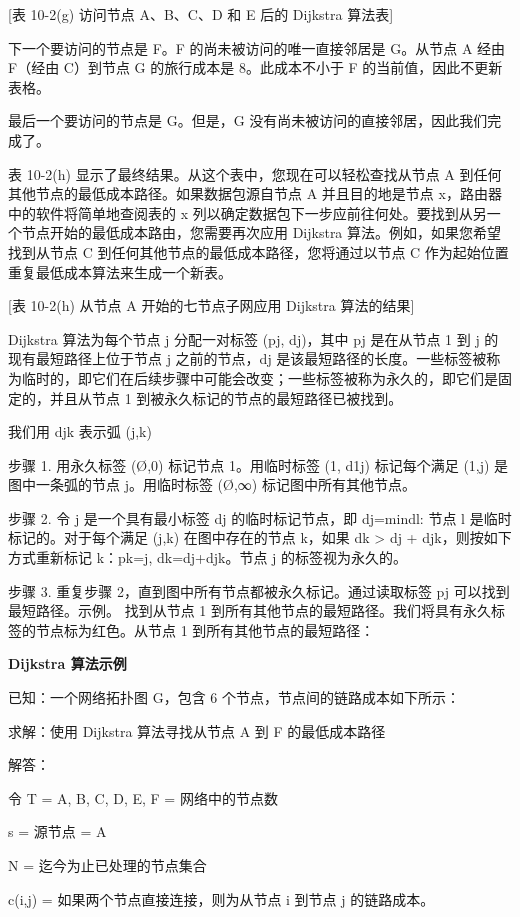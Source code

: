 \documentclass[12pt,a4paper,oneside,UTF8]{ctexart}
\begin{document}
[表 10-2(g) 访问节点 A、B、C、D 和 E 后的 Dijkstra 算法表]

下一个要访问的节点是 F。F 的尚未被访问的唯一直接邻居是 G。从节点 A 经由 F（经由 C）到节点 G 的旅行成本是 8。此成本不小于 F 的当前值，因此不更新表格。

最后一个要访问的节点是 G。但是，G 没有尚未被访问的直接邻居，因此我们完成了。

表 10-2(h) 显示了最终结果。从这个表中，您现在可以轻松查找从节点 A 到任何其他节点的最低成本路径。如果数据包源自节点 A 并且目的地是节点 x，路由器中的软件将简单地查阅表的 x 列以确定数据包下一步应前往何处。要找到从另一个节点开始的最低成本路由，您需要再次应用 Dijkstra 算法。例如，如果您希望找到从节点 C 到任何其他节点的最低成本路径，您将通过以节点 C 作为起始位置重复最低成本算法来生成一个新表。

[表 10-2(h) 从节点 A 开始的七节点子网应用 Dijkstra 算法的结果]

Dijkstra 算法为每个节点 j 分配一对标签 (pj, dj)，其中 pj 是在从节点 1 到 j 的现有最短路径上位于节点 j 之前的节点，dj 是该最短路径的长度。一些标签被称为临时的，即它们在后续步骤中可能会改变；一些标签被称为永久的，即它们是固定的，并且从节点 1 到被永久标记的节点的最短路径已被找到。

我们用 djk 表示弧 (j,k) 

步骤 1. 用永久标签 (Ø,0) 标记节点 1。用临时标签 (1, d1j) 标记每个满足 (1,j) 是图中一条弧的节点 j。用临时标签 (Ø,∞) 标记图中所有其他节点。

步骤 2. 令 j 是一个具有最小标签 dj 的临时标记节点，即 dj=min{dl: 节点 l 是临时标记的}。对于每个满足 (j,k) 在图中存在的节点 k，如果 dk > dj + djk，则按如下方式重新标记 k：pk=j, dk=dj+djk。节点 j 的标签视为永久的。

步骤 3. 重复步骤 2，直到图中所有节点都被永久标记。通过读取标签 pj 可以找到最短路径。示例。 找到从节点 1 到所有其他节点的最短路径。我们将具有永久标签的节点标为红色。从节点 1 到所有其他节点的最短路径：

{\bf Dijkstra 算法示例}

已知：一个网络拓扑图 G，包含 6 个节点，节点间的链路成本如下所示：

求解：使用 Dijkstra 算法寻找从节点 A 到 F 的最低成本路径

解答：

令 T = {A, B, C, D, E, F} = 网络中的节点数

s = 源节点 = A

N = 迄今为止已处理的节点集合

c(i,j) = 如果两个节点直接连接，则为从节点 i 到节点 j 的链路成本。
\end{document}
